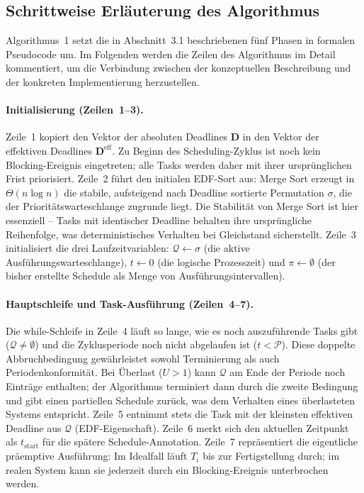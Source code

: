 ﻿\documentclass[a4paper,12pt]{article}
\theoremstyle{definition}
\begin{document}
	\subsection{Schrittweise Erläuterung des Algorithmus}
	
	Algorithmus~1 setzt die in Abschnitt~3.1 beschriebenen fünf Phasen in formalen Pseudocode um.
	Im Folgenden werden die Zeilen des Algorithmus im Detail kommentiert, um die Verbindung
	zwischen der konzeptuellen Beschreibung und der konkreten Implementierung herzustellen.
	
	\paragraph{Initialisierung (Zeilen~1--3).}
	Zeile~1 kopiert den Vektor der absoluten Deadlines $\mathbf{D}$ in den Vektor der effektiven
	Deadlines $\mathbf{D}^{\text{eff}}$. Zu Beginn des Scheduling-Zyklus ist noch kein
	Blocking-Ereignis eingetreten; alle Tasks werden daher mit ihrer ursprünglichen Frist
	priorisiert. Zeile~2 führt den initialen EDF-Sort aus: Merge Sort erzeugt in $\Theta(n \log n)$
	die stabile, aufsteigend nach Deadline sortierte Permutation $\sigma$, die der
	Prioritätswarteschlange zugrunde liegt. Die Stabilität von Merge Sort ist hier
	essenziell -- Tasks mit identischer Deadline behalten ihre ursprüngliche Reihenfolge,
	was deterministisches Verhalten bei Gleichstand sicherstellt.
	Zeile~3 initialisiert die drei Laufzeitvariablen: $\mathcal{Q} \leftarrow \sigma$ (die
	aktive Ausführungswarteschlange), $t \leftarrow 0$ (die logische Prozesszeit) und
	$\pi \leftarrow \emptyset$ (der bisher erstellte Schedule als Menge von Ausführungsintervallen).
	
	\paragraph{Hauptschleife und Task-Ausführung (Zeilen~4--7).}
	Die while-Schleife in Zeile~4 läuft so lange, wie es noch auszuführende Tasks gibt
	($\mathcal{Q} \neq \emptyset$) und die Zyklusperiode noch nicht abgelaufen ist
	($t < \mathcal{P}$). Diese doppelte Abbruchbedingung gewährleistet sowohl Terminierung
	als auch Periodenkonformität. Bei Überlast ($U > 1$) kann $\mathcal{Q}$ am Ende der
	Periode noch Einträge enthalten; der Algorithmus terminiert dann durch die zweite
	Bedingung und gibt einen partiellen Schedule zurück, was dem Verhalten eines
	überlasteten Systems entspricht.
	Zeile~5 entnimmt stets die Task mit der kleinsten effektiven Deadline aus $\mathcal{Q}$
	(EDF-Eigenschaft). Zeile~6 merkt sich den aktuellen Zeitpunkt als $t_{\text{start}}$
	für die spätere Schedule-Annotation. Zeile~7 repräsentiert die eigentliche
	präemptive Ausführung: Im Idealfall läuft $T_i$ bis zur Fertigstellung durch;
	im realen System kann sie jederzeit durch ein Blocking-Ereignis unterbrochen werden.
	
\end{document}
